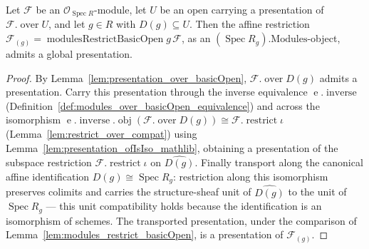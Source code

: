 \begin{lemma}
  \label{lem:presentation_modulesRestrictBasicOpen}
  Let \(\mathcal{F}\) be an \(\mathcal{O}_{\operatorname{Spec} R}\)-module, let \(U\) be an open
  carrying a presentation of \(\mathcal{F}.\operatorname{over} U\), and let \(g \in R\) with
  \(D(g) \subseteq U\). Then the affine restriction \(\mathcal{F}_{(g)} =
  \operatorname{modulesRestrictBasicOpen} g\, \mathcal{F}\), as an
  \((\operatorname{Spec} R_g).\mathrm{Modules}\)-object, admits a global presentation.
\end{lemma}
\begin{proof}
  By Lemma~\ref{lem:presentation_over_basicOpen}, \(\mathcal{F}.\operatorname{over} D(g)\)
  admits a presentation. Carry this presentation through the inverse equivalence
  \(\operatorname{e}.\operatorname{inverse}\) (Definition~\ref{def:modules_over_basicOpen_equivalence})
  and across the isomorphism \(\operatorname{e}.\operatorname{inverse}.\operatorname{obj}
  (\mathcal{F}.\operatorname{over} D(g)) \cong \mathcal{F}.\operatorname{restrict} \iota\)
  (Lemma~\ref{lem:restrict_over_compat}) using Lemma~\ref{lem:presentation_ofIsIso_mathlib},
  obtaining a presentation of the subspace restriction \(\mathcal{F}.\operatorname{restrict} \iota\) on
  \(\widehat{D(g)}\). Finally transport along the canonical affine identification \(D(g) \cong
  \operatorname{Spec} R_g\): restriction along this isomorphism preserves colimits and
  carries the structure-sheaf unit of \(\widehat{D(g)}\) to the unit of \(\operatorname{Spec} R_g\)
  — this unit compatibility holds because the identification is an isomorphism of schemes.
  The transported presentation, under
  the comparison of Lemma~\ref{lem:modules_restrict_basicOpen}, is a presentation of
  \(\mathcal{F}_{(g)}\).
\end{proof}

